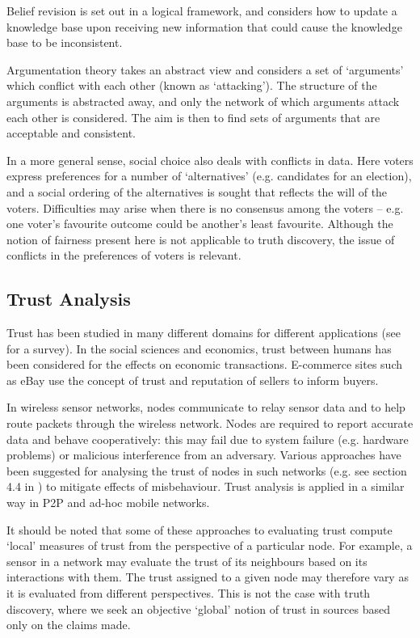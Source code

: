 \documentclass[../main.tex]{subfiles}
\begin{document}
Belief revision \cite{gardenfors} is set out in a logical framework, and
considers how to update a knowledge base upon receiving new information that
could cause the knowledge base to be inconsistent.

Argumentation theory \cite{hofa_semantics} takes an abstract view and considers
a set of `arguments' which conflict with each other (known as `attacking'). The
structure of the arguments is abstracted away, and only the network of which
arguments attack each other is considered. The aim is then to find sets of
arguments that are acceptable and consistent.

In a more general sense, social choice also deals with conflicts in data. Here
voters express preferences for a number of `alternatives' (e.g. candidates for
an election), and a social ordering of the alternatives is sought that reflects
the will of the voters. Difficulties may arise when there is no consensus among
the voters -- e.g. one voter's favourite outcome could be another's least
favourite. Although the notion of fairness present here is not applicable
to truth discovery, the issue of conflicts in the preferences of voters is
relevant.

\subsection{Trust Analysis}

Trust has been studied in many different domains for different applications
(see \cite{momani_challa} for a survey). In the social sciences and economics,
trust between humans has been considered for the effects on economic
transactions. E-commerce sites such as eBay use the concept of trust and
reputation of sellers to inform buyers.

In wireless sensor networks, nodes communicate to relay sensor data and to help
route packets through the wireless network. Nodes are required to report
accurate data and behave cooperatively: this may fail due to system failure
(e.g. hardware problems) or malicious interference from an adversary. Various
approaches have been suggested for analysing the trust of nodes in such
networks (e.g. see section 4.4 in \cite{momani_challa}) to mitigate effects of
misbehaviour. Trust analysis is applied in a similar way in P2P and ad-hoc
mobile networks.

It should be noted that some of these approaches to evaluating trust compute
`local' measures of trust from the perspective of a particular node. For
example, a sensor in a network may evaluate the trust of its neighbours based
on its interactions with them. The trust assigned to a given node may therefore
vary as it is evaluated from different perspectives. This is not the case with
truth discovery, where we seek an objective `global' notion of trust in sources
based only on the claims made.
\end{document}
